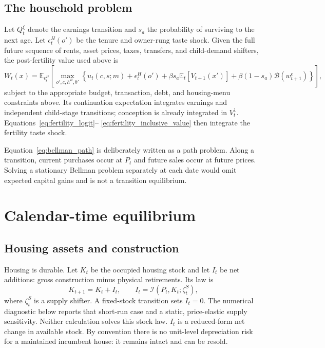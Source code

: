 \documentclass[11pt]{article}
\theoremstyle{definition}
\newcommand{\E}{\mathbb E}
\newcommand{\1}{\mathbf 1}
\newcommand{\Bcal}{\mathcal B}
\begin{document}
\subsection{The household problem}

Let $Q_t^\xi$ denote the earnings transition and $s_a$ the probability of
surviving to the next age. Let $\epsilon_t^H(o')$ be the tenure and owner-rung
taste shock. Given the full future sequence of rents, asset prices, taxes,
transfers, and child-demand shifters, the post-fertility value used above is
\begin{equation}
 W_t(x)=\E_{\epsilon_t^H}\left[
 \max_{o',c,h^R,b'}
 \left\{
 u_t(c,s;m)+\epsilon_t^H(o')+\beta s_a\E_t[V_{t+1}(x')]
 +\beta(1-s_a)\Bcal(w^e_{t+1})
 \right\}
 \right],
 \label{eq:bellman_path}
\end{equation}
subject to the appropriate budget, transaction, debt, and housing-menu
constraints above. Its continuation expectation integrates earnings and
independent child-stage transitions; conception is already integrated in
$V_t^1$. Equations~\eqref{eq:fertility_logit}--
\eqref{eq:fertility_inclusive_value} then integrate the fertility taste shock.

Equation~\eqref{eq:bellman_path} is deliberately written as a path problem.
Along a transition, current purchases occur at $P_t$ and future sales occur at
future prices. Solving a stationary Bellman problem separately at each date
would omit expected capital gains and is not a transition equilibrium.

\section{Calendar-time equilibrium}
\label{sec:calendar_equilibrium}

\subsection{Housing assets and construction}

Housing is durable. Let $K_t$ be the occupied housing stock and let $I_t$ be
net additions: gross construction minus physical retirements. Its law is
\begin{equation}
 K_{t+1}=K_t+I_t,
 \qquad I_t=\mathcal I(P_t,K_t;\zeta_t^S),
 \label{eq:housing_stock_law}
\end{equation}
where $\zeta_t^S$ is a supply shifter. A fixed-stock transition sets $I_t=0$.
The numerical diagnostic below reports that short-run case and a static,
price-elastic supply sensitivity. Neither calculation solves this stock law.
$I_t$ is a reduced-form net change in available stock. By convention there is
no unit-level depreciation risk for a maintained incumbent house: it remains
intact and can be resold.
\end{document}
